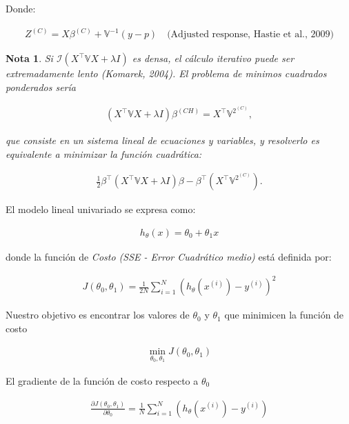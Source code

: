 \documentclass[12pt]{article}
\newtheorem{Note}{Nota}%
\begin{document}
Donde:

\begin{eqnarray}
Z^{(C)} = X \beta^{(C)} + \mathbb{V}^{-1} (y - p)
\quad \text{(Adjusted response, Hastie et al., 2009)}
\end{eqnarray}

\begin{Note}
Si $\mathcal{I}\left( X^\top \mathbb{V} X + \lambda I \right)$ es densa, el cálculo iterativo puede ser extremadamente lento (Komarek, 2004). El problema de minimos cuadrados ponderados ser\'ia

\begin{eqnarray}
\left( X^\top \mathbb{V} X + \lambda I \right) \beta^{(CH)} = X^\top \mathbb{V}^{2^{(C)}},
\end{eqnarray}

que consiste en un sistema lineal de ecuaciones y variables, y resolverlo es equivalente a minimizar la función cuadrática:

\begin{eqnarray}
\frac{1}{2} \beta^\top \left( X^\top \mathbb{V} X + \lambda I \right) \beta - \beta^\top \left( X^\top \mathbb{V}^{2^{(C)}} \right).
\end{eqnarray}
\end{Note}



El modelo lineal univariado se expresa como:

\begin{eqnarray*}
h_\theta(x) = \theta_0 + \theta_1 x
\end{eqnarray*}

donde la función de \textit{Costo (SSE - Error Cuadrático medio)} está definida por:

\begin{eqnarray*}
J(\theta_0, \theta_1) = \frac{1}{2N} \sum_{i=1}^{N} \left( h_\theta(x^{(i)}) - y^{(i)} \right)^2
\end{eqnarray*}

Nuestro objetivo es encontrar los valores de $\theta_0$ y $\theta_1$ que minimicen la función de costo

\begin{eqnarray*}
\min_{\theta_0, \theta_1} J(\theta_0, \theta_1)
\end{eqnarray*}

El gradiente de la función de costo respecto a $\theta_0$

\begin{eqnarray*}
\frac{\partial J(\theta_0, \theta_1)}{\partial \theta_0} = \frac{1}{N} \sum_{i=1}^{N} \left( h_\theta(x^{(i)}) - y^{(i)} \right)
\end{eqnarray*}
\end{document}
